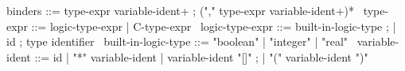 \begin{syntax}
  binders ::= type-expr variable-ident+ ;
  ("," type-expr variable-ident+)*
  \
  type-expr ::= logic-type-expr | C-type-expr
  \
  logic-type-expr ::= built-in-logic-type ;
  | id ; type identifier
  \
  built-in-logic-type ::= "boolean" | "integer" | "real" 
  \
  variable-ident ::= id 
  | "*" variable-ident 
  | variable-ident "[]" ;
  | "(" variable-ident ")"
\end{syntax}